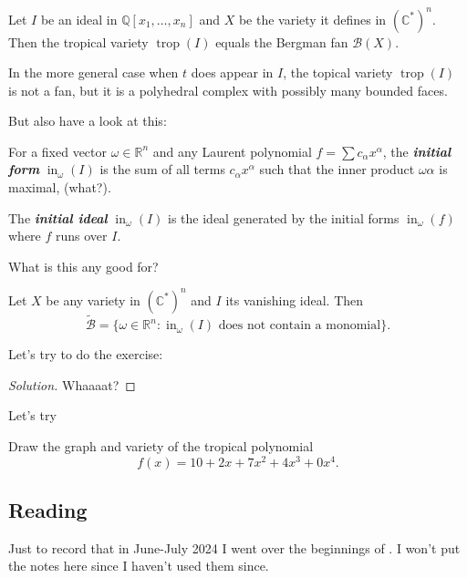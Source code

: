 \begin{thm}
	Let $I$ be an ideal in $\mathbb{Q}[x_1,\ldots,x_n]$ and $X$ be the variety it defines in $(\mathbb{C}^*)^n$. Then the tropical variety $\operatorname{trop}(I)$ equals the Bergman fan $\mathcal{B}(X)$.
\end{thm}
In the more general case when $t$ does appear in $I$, the topical variety $\operatorname{trop}(I)$ is not a fan, but it is a polyhedral complex with possibly many bounded faces.

But also have a look at this:
\begin{defn}
	For a fixed vector $\omega\in \mathbb{R}^{n}$ and any Laurent polynomial $f=\sum c_\alpha x^\alpha$, the \textit{\textbf{initial form}} $\operatorname{in}_\omega(I)$ is the sum of all terms $c_\alpha x^\alpha$ such that {\color{magenta}the inner product $\omega\alpha$ is maximal, (what?)}.

	The \textit{\textbf{initial ideal}} $\operatorname{in}_\omega(I)$ is the ideal generated by the initial forms $\operatorname{in}_\omega(f)$ where $f$ runs over  $I$.
\end{defn}

What is this any good for?
\begin{lemma}
	Let $X$ be any variety in $(\mathbb{C}^*)^n$ and $I$ its vanishing ideal. Then
	\[
		\widetilde{\mathcal{B}}=\{\omega\in \mathbb{R}^{n}:\operatorname{in}_\omega(I)\text{ does not contain a monomial} \} 
	.\]
	
\end{lemma}

Let's try to do the exercise:
\begin{proof}[Solution]
	Whaaaat?	
\end{proof}

Let's try
\begin{exercise}[9.5.(1)]
	Draw the graph and variety of the tropical polynomial
	\[
	f(x)=10+2x+7x^2+4x^3+0x^4
	.\]
\end{exercise}

\subsection{Reading \cite{def0}}

{\color{2}Just to record that in June-July 2024 I went over the beginnings of \cite{def0}. I won't put the notes here since I haven't used them since.}

